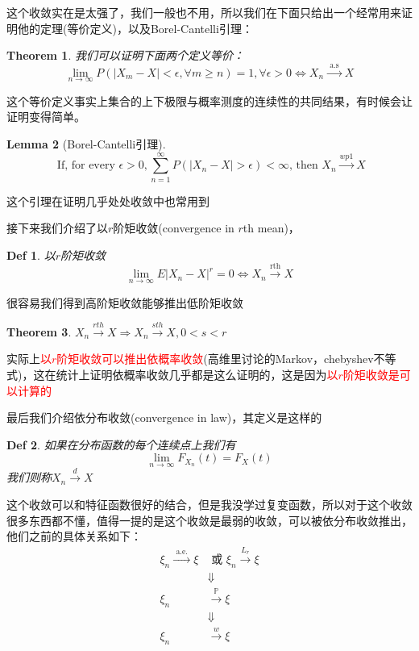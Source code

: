 \documentclass{article}
\newtheorem{theorem}{Theorem}[section]
\newtheorem{defination}{Def}[section]
\newtheorem{lemma}[theorem]{Lemma}
\begin{document}
这个收敛实在是太强了，我们一般也不用，所以我们在下面只给出一个经常用来证明他的定理(等价定义)，以及Borel-Cantelli引理：
\begin{theorem}
	我们可以证明下面两个定义等价：
	$$\lim _{n \rightarrow \infty} P\left(\left|X_m-X\right|<\epsilon, \forall m \geq n\right)=1, \forall\epsilon>0 \Leftrightarrow  X_n \stackrel{\text { a.s }}{\rightarrow} X$$
\end{theorem}
这个等价定义事实上集合的上下极限与概率测度的连续性的共同结果，有时候会让证明变得简单。
\begin{lemma}[Borel-Cantelli引理]
	$$
	\text { If, for every } \epsilon>0, \sum_{n=1}^{\infty} P\left(\left|X_n-X\right|>\epsilon\right)<\infty \text {, then } X_n \stackrel{w p 1}{\rightarrow} X
	$$
\end{lemma}
这个引理在证明几乎处处收敛中也常用到
\par 接下来我们介绍了以$r$阶矩收敛(convergence in $r$th mean)，
\begin{defination}
	以$r$阶矩收敛
	\begin{equation*}
		\lim _{n \rightarrow \infty} E\left|X_n-X\right|^r=0 \Leftrightarrow X_n \stackrel{\text{rth}}{\rightarrow}X
	\end{equation*}
\end{defination}
很容易我们得到高阶矩收敛能够推出低阶矩收敛
\begin{theorem}
	$X_n \stackrel{r t h}{\rightarrow} X \Rightarrow X_n \stackrel{s t h}{\rightarrow} X, 0<s<r$
\end{theorem}
实际上\textcolor{red}{以$r$阶矩收敛可以推出依概率收敛}(高维里讨论的Markov，chebyshev不等式)，这在统计上证明依概率收敛几乎都是这么证明的，这是因为\textcolor{red}{以$r$阶矩收敛是可以计算的}
\par 最后我们介绍依分布收敛(convergence in law)，其定义是这样的
\begin{defination}
	如果在分布函数的每个连续点上我们有
	$$
	\lim _{n \rightarrow \infty} F_{X_n}(t)=F_X(t)
	$$
	我们则称$X_n\stackrel{d}{\rightarrow}X$
\end{defination}
这个收敛可以和特征函数很好的结合，但是我没学过复变函数，所以对于这个收敛很多东西都不懂，值得一提的是这个收敛是最弱的收敛，可以被依分布收敛推出，他们之前的具体关系如下：
$$\begin{aligned} \xi_n \stackrel{\text { a.e. }}{\longrightarrow} \xi & \text { 或 } \xi_n \stackrel{L_r}{\longrightarrow} \xi \\ & \Downarrow \\ \xi_n & \stackrel{\mathbb{P}}{\rightarrow} \xi \\ & \Downarrow \\ \xi_n & \stackrel{w}{\rightarrow} \xi\end{aligned}$$
\end{document}
